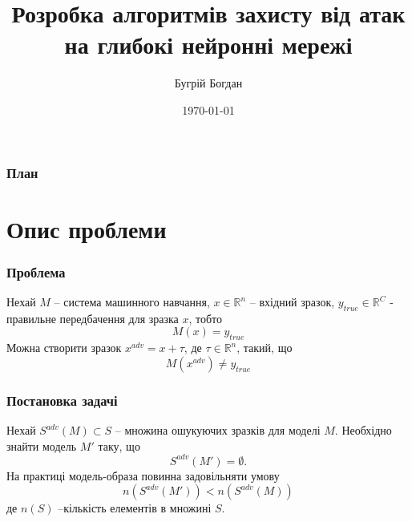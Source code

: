 \documentclass{beamer}
\title[Short title]{Розробка алгоритмів захисту від атак на глибокі нейронні мережі} %
\author{Бугрій Богдан} %
\institute[UCLA] %
{
	Львівський національний університет імені Івана Франка \\
	Факультет прикладної математики та інформатики 
}
\date{\today} %
\numberwithin{equation}{section}
\begin{document}
	
	\begin{frame}
		\titlepage
	\end{frame}
	
	
	\begin{frame}
		\frametitle{План}
		\tableofcontents
	\end{frame}

	\section{Опис проблеми}
	

	\begin{frame}
		\frametitle{Проблема}
		Нехай $M$ -- система машинного навчання, $x\in \mathbb{R}^n$ -- вхідний зразок, $y_{true}\in \mathbb{R}^C$ - правильне передбачення для зразка $x$, тобто 
		\begin{equation}
			M(x) = y_{true}
		\end{equation} 
		Можна створити зразок $x^{adv}=x+\tau$, де $\tau\in \mathbb{R}^n$, такий, що 
		\begin{equation}
			M(x^{adv})\neq y_{true}
		\end{equation}
	\end{frame}

	\begin{frame}
		\frametitle{Постановка задачі}
		Нехай $S^{adv}(M) \subset S$ -- множина ошукуючих зразків для моделі $M$. Необхідно знайти модель $M'$ таку, що
		\begin{equation}
			S^{adv}(M') = \emptyset.
		\end{equation}
		На практиці модель-образа повинна задовільняти умову
		\begin{equation}
			n(S^{adv}(M')) < n(S^{adv}(M))
		\end{equation}
		де $n(S)$ --кількість елементів в множині $S$.
	\end{frame}
\end{document}
